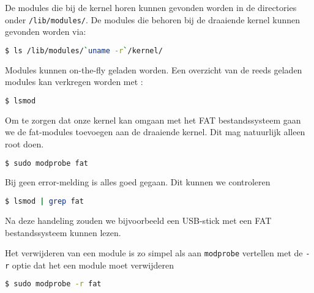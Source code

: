 De modules die bij de kernel horen kunnen gevonden worden in de directories onder \texttt{/lib/modules/}. De modules die behoren bij de draaiende kernel kunnen gevonden worden via:
\begin{lstlisting}[language=bash]
$ ls /lib/modules/`uname -r`/kernel/
\end{lstlisting}

Modules kunnen on-the-fly geladen worden. Een overzicht van de reeds geladen modules kan verkregen worden met :
\begin{lstlisting}[language=bash]
$ lsmod
\end{lstlisting}

Om te zorgen dat onze kernel kan omgaan met het FAT bestandssysteem gaan we de fat-modules toevoegen aan de draaiende kernel. Dit mag natuurlijk alleen root doen.
\begin{lstlisting}[language=bash]
$ sudo modprobe fat
\end{lstlisting}
Bij geen error-melding is alles goed gegaan. Dit kunnen we controleren
\begin{lstlisting}[language=bash]
$ lsmod | grep fat
\end{lstlisting}
Na deze handeling zouden we bijvoorbeeld een USB-stick met een FAT bestandssysteem kunnen lezen.

Het verwijderen van een module is zo simpel als aan \texttt{modprobe} vertellen met de \texttt{-r} optie dat het een module moet verwijderen
\begin{lstlisting}[language=bash]
$ sudo modprobe -r fat
\end{lstlisting}

